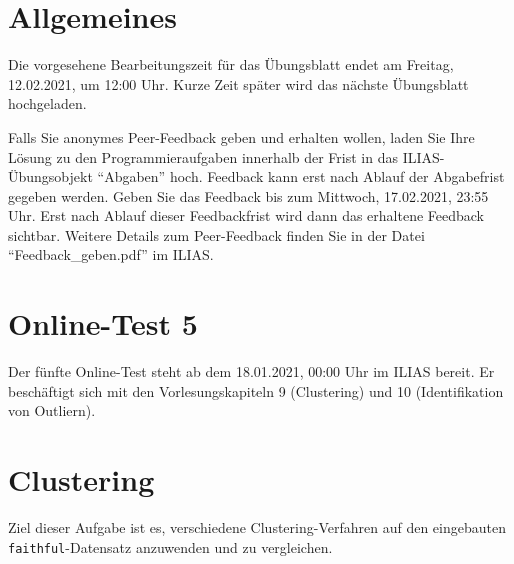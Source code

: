 \documentclass[headinclude,headsepline]{scrartcl}
\newcommand{\code}[1]{{\color[HTML]{000080}\texttt{#1}}}
\begin{document}
\section*{Allgemeines}

Die vorgesehene Bearbeitungszeit für das Übungsblatt endet am Freitag, 12.02.2021, um 12:00 Uhr.
Kurze Zeit später wird das nächste Übungsblatt hochgeladen.

Falls Sie anonymes Peer-Feedback geben und erhalten wollen, laden Sie Ihre Lösung zu den Programmieraufgaben innerhalb der Frist in das ILIAS-Übungsobjekt ``Abgaben'' hoch.
Feedback kann erst nach Ablauf der Abgabefrist gegeben werden.
Geben Sie das Feedback bis zum Mittwoch, 17.02.2021, 23:55 Uhr.
Erst nach Ablauf dieser Feedbackfrist wird dann das erhaltene Feedback sichtbar.
Weitere Details zum Peer-Feedback finden Sie in der Datei ``Feedback\_geben.pdf'' im ILIAS.

\section{Online-Test 5}

Der fünfte Online-Test steht ab dem 18.01.2021, 00:00 Uhr im ILIAS bereit.
Er beschäftigt sich mit den Vorlesungskapiteln 9 (Clustering) und 10 (Identifikation von Outliern).

\section{Clustering}

Ziel dieser Aufgabe ist es, verschiedene Clustering-Verfahren auf den eingebauten \code{faithful}-Datensatz anzuwenden und zu vergleichen.
\end{document}
